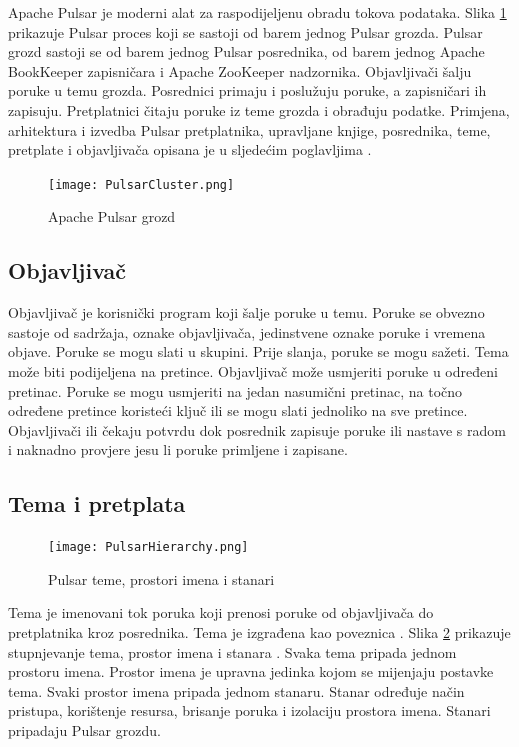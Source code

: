 \documentclass[utf8, diplomski, lmodern, numeric]{fer}
\begin{document}
Apache Pulsar je moderni alat za raspodijeljenu obradu tokova podataka. Slika \ref{fig:pulsar-cluster} prikazuje Pulsar proces koji se sastoji od barem jednog Pulsar grozda. Pulsar grozd sastoji se od barem jednog Pulsar posrednika, od barem jednog Apache BookKeeper zapisničara i Apache ZooKeeper nadzornika. Objavljivači šalju poruke u temu grozda. Posrednici primaju i poslužuju poruke, a zapisničari ih zapisuju. Pretplatnici čitaju poruke iz teme grozda i obrađuju podatke. Primjena, arhitektura i izvedba Pulsar pretplatnika, upravljane knjige, posrednika, teme, pretplate i objavljivača opisana je u sljedećim poglavljima \citep{pulsar-docs} \citep{pulsar-streamlio-1} \citep{pulsar-streamlio-2} \citep{pulsar-streamlio-intro}.

\begin{figure}[H]
    \centering
    \texttt{[image: PulsarCluster.png]}
    \caption{Apache Pulsar grozd}
    \label{fig:pulsar-cluster}
\end{figure}

\subsection{Objavljivač}

Objavljivač je korisnički program koji šalje poruke u temu. Poruke se obvezno sastoje od sadržaja, oznake objavljivača, jedinstvene oznake poruke i vremena objave. Poruke se mogu slati u skupini. Prije slanja, poruke se mogu sažeti. Tema može biti podijeljena na pretince. Objavljivač može usmjeriti poruke u određeni pretinac. Poruke se mogu usmjeriti na jedan nasumični pretinac, na točno određene pretince koristeći ključ ili se mogu slati jednoliko na sve pretince. Objavljivači ili čekaju potvrdu dok posrednik zapisuje poruke ili nastave s radom i naknadno provjere jesu li poruke primljene i zapisane.

\subsection{Tema i pretplata}

\begin{figure}[H]
    \centering
    \texttt{[image: PulsarHierarchy.png]}
    \caption{Pulsar teme, prostori imena i stanari}
    \label{fig:pulsar-hierarchy}
\end{figure}

Tema je imenovani tok poruka koji prenosi poruke od objavljivača do pretplatnika kroz posrednika. Tema je izgrađena kao poveznica . Slika \ref{fig:pulsar-hierarchy} prikazuje stupnjevanje tema, prostor imena  i stanara . Svaka tema pripada jednom prostoru imena. Prostor imena je upravna jedinka kojom se mijenjaju postavke tema. Svaki prostor imena pripada jednom stanaru. Stanar određuje način pristupa, korištenje resursa, brisanje poruka i izolaciju prostora imena. Stanari pripadaju Pulsar grozdu.
\end{document}
